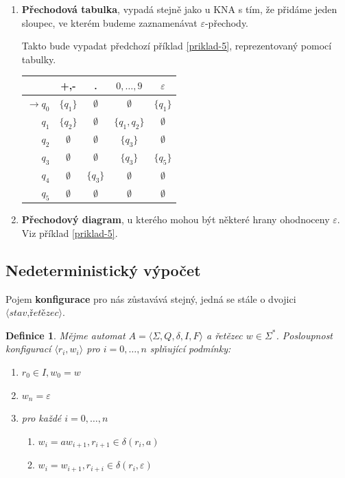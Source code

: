 \documentclass[10pt, a4paper, titlepage]{article}
\theoremstyle{note}
\newtheorem{definice}{\textbf{Definice}}
\begin{document}
\begin{enumerate}

\item
\textbf{Přechodová tabulka}, vypadá stejně jako u KNA s tím, že přidáme jeden sloupec, ve kterém budeme zaznamenávat $\varepsilon$-přechody.

Takto bude vypadat předchozí příklad \ref{priklad-5}, reprezentovaný pomocí tabulky.

\begin{center}
\begin{tabular}{ r || c | c | c | c }                   
   & +,- & . & $0,\ldots,9$ & $\varepsilon$ \\
   \hline
   $ \rightarrow q_{0} $ & $ \lbrace q_{1} \rbrace $ & $ \emptyset $ & $ \emptyset $ & $ \lbrace q_{1} \rbrace $\\
   $ q_{1} $ & $ \lbrace q_{2} \rbrace $ & $ \emptyset $ & $ \lbrace q_{1},q_{2} \rbrace $ & $\emptyset$ \\
   $ q_{2} $ & $ \emptyset $ & $ \emptyset $ & $\lbrace q_{3} \rbrace$ & $ \emptyset $ \\
   $ q_{3} $ & $ \emptyset $ & $ \emptyset $ & $\lbrace q_{3} \rbrace$ & $\lbrace q_{5} \rbrace$ \\
   $ q_{4} $ & $ \emptyset $ & $\lbrace q_{3} \rbrace$ & $\emptyset$ & $ \emptyset $ \\
   $ q_{5} $ & $ \emptyset $ &  $ \emptyset $ & $\emptyset$ & $ \emptyset $ 
\end{tabular}
\end{center}

\item
\textbf{Přechodový diagram}, u kterého mohou být některé hrany ohodnoceny $\varepsilon$. Viz příklad \ref{priklad-5}.

\end{enumerate}

\subsection{Nedeterministický výpočet}
Pojem \textbf{konfigurace} pro nás zůstavává stejný, jedná se stále o dvojici $\langle \textit{stav,řetězec} \rangle$.

\begin{definice}
Mějme automat $A = \langle \Sigma,Q,\delta,I,F \rangle$ a řetězec $w \in \Sigma^*$. Posloupnost konfigurací $\langle r_i,w_i \rangle$ pro $i=0,\ldots,n$ splňující podmínky:
\begin{enumerate}
\item
$r_{0} \in I, w_0=w$
\item
$w_{n} = \varepsilon$
\item
pro každé $i=0,\ldots,n$
\begin{enumerate}
\item
$w_i = aw_{i+1}, r_{i+1} \in \delta(r_i,a)$
\item
$w_i=w_{i+1} , r_{i+i} \in \delta(r_i,\varepsilon)$
\end{enumerate}
\end{enumerate}

\end{definice}
\end{document}
